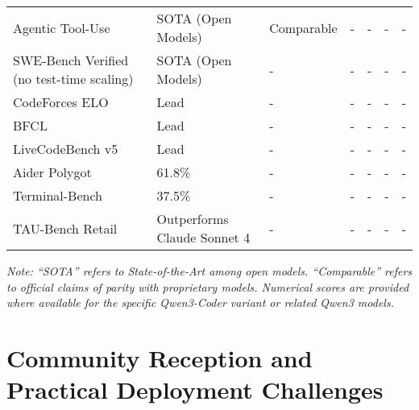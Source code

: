 \begin{table}[htbp]
\begin{tabu}{X[1.7]X[1.7]X[1.7]XXXX}
		Agentic Tool-Use                          & SOTA (Open Models) \cite{qwenlm_qwen3coder_blog_2025}           & Comparable \cite{qwenlm_qwen3coder_blog_2025} & -       & -       & -                 & -              \\
		SWE-Bench Verified (no test-time scaling) & SOTA (Open Models) \cite{qwenlm_qwen3coder_blog_2025}           & -                                             & -       & -       & -                 & -              \\
		CodeForces ELO                            & Lead \cite{apidog_qwen3coder_2025}                              & -                                             & -       & -       & -                 & -              \\
		BFCL                                      & Lead \cite{apidog_qwen3coder_2025}                              & -                                             & -       & -       & -                 & -              \\
		LiveCodeBench v5                          & Lead \cite{apidog_qwen3coder_2025}                              & -                                             & -       & -       & -                 & -              \\
		Aider Polygot                             & 61.8\% \cite{unsloth_qwen3coder_local_2025}                     & -                                             & -       & -       & -                 & -              \\
		Terminal-Bench                            & 37.5\% \cite{github_qwenlm_qwencode_2025}                       & -                                             & -       & -       & -                 & -              \\
		TAU-Bench Retail                          & Outperforms Claude Sonnet 4 \cite{gupta_qwen3coder_medium_2025} & -                                             & -       & -       & -                 & -              \\
        \bottomrule
	\end{tabu}%
	\footnotesize%
	\textit{Note: ``SOTA'' refers to State-of-the-Art among open models. ``Comparable'' refers to official claims of parity with proprietary models. Numerical scores are provided where available for the specific Qwen3-Coder variant or related Qwen3 models.}
\end{table}


\section{Community Reception and Practical Deployment Challenges}

